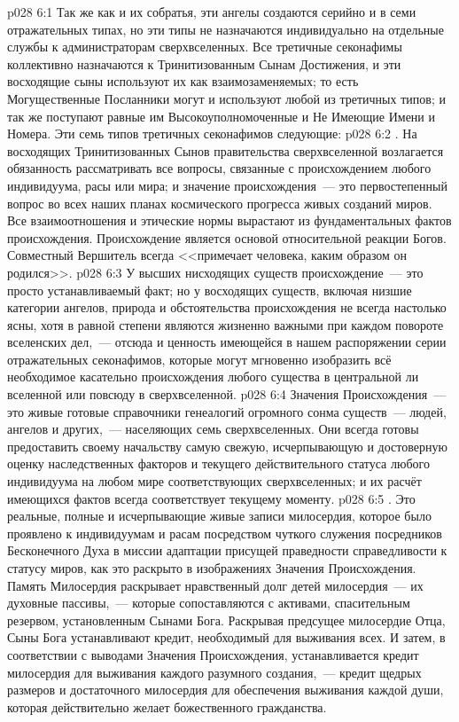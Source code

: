 \vs p028 6:1 Так же как и их собратья, эти ангелы создаются серийно и в семи отражательных типах, но эти типы не назначаются индивидуально на отдельные службы к администраторам сверхвселенных. Все третичные секонафимы коллективно назначаются к Тринитизованным Сынам Достижения, и эти восходящие сыны используют их как взаимозаменяемых; то есть Могущественные Посланники могут и используют любой из третичных типов; и так же поступают равные им Высокоуполномоченные и Не Имеющие Имени и Номера. Эти семь типов третичных секонафимов следующие:
\vs p028 6:2 . На восходящих Тринитизованных Сынов правительства сверхвселенной возлагается обязанность рассматривать все вопросы, связанные с происхождением любого индивидуума, расы или мира; и значение происхождения~--- это первостепенный вопрос во всех наших планах космического прогресса живых созданий миров. Все взаимоотношения и этические нормы вырастают из фундаментальных фактов происхождения. Происхождение является основой относительной реакции Богов. Совместный Вершитель всегда <<примечает человека, каким образом он родился>>.
\vs p028 6:3 У высших нисходящих существ происхождение~--- это просто устанавливаемый факт; но у восходящих существ, включая низшие категории ангелов, природа и обстоятельства происхождения не всегда настолько ясны, хотя в равной степени являются жизненно важными при каждом повороте вселенских дел,~--- отсюда и ценность имеющейся в нашем распоряжении серии отражательных секонафимов, которые могут мгновенно изобразить всё необходимое касательно происхождения любого существа в центральной ли вселенной или повсюду в сверхвселенной.
\vs p028 6:4 Значения Происхождения~--- это живые готовые справочники генеалогий огромного сонма существ~--- людей, ангелов и других,~--- населяющих семь сверхвселенных. Они всегда готовы предоставить своему начальству самую свежую, исчерпывающую и достоверную оценку наследственных факторов и текущего действительного статуса любого индивидуума на любом мире соответствующих сверхвселенных; и их расчёт имеющихся фактов всегда соответствует текущему моменту.
\vs p028 6:5 . Это реальные, полные и исчерпывающие живые записи милосердия, которое было проявлено к индивидуумам и расам посредством чуткого служения посредников Бесконечного Духа в миссии адаптации присущей праведности справедливости к статусу миров, как это раскрыто в изображениях Значения Происхождения. Память Милосердия раскрывает нравственный долг детей милосердия~--- их духовные пассивы,~--- которые сопоставляются с активами, спасительным резервом, установленным Сынами Бога. Раскрывая предсущее милосердие Отца, Сыны Бога устанавливают кредит, необходимый для выживания всех. И затем, в соответствии с выводами Значения Происхождения, устанавливается кредит милосердия для выживания каждого разумного создания,~--- кредит щедрых размеров и достаточного милосердия для обеспечения выживания каждой души, которая действительно желает божественного гражданства.
